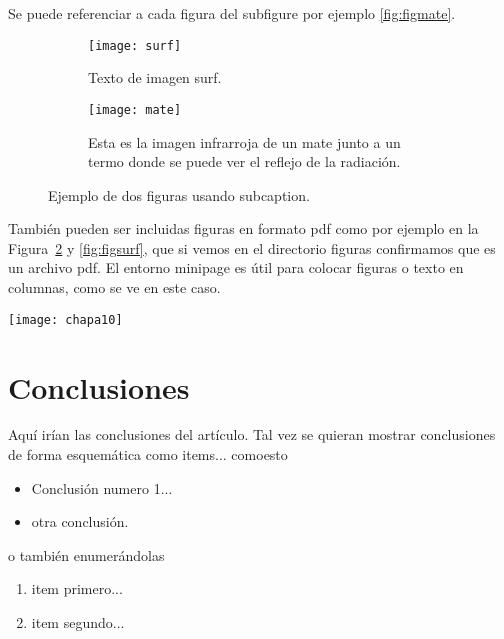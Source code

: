 \documentclass[a4paper,11pt]{article}
\begin{document}
Se puede referenciar a cada figura del subfigure por ejemplo \autoref{fig:figmate}.

\begin{figure}[htb]
  \begin{subfigure}[t]{.6\linewidth}
	\centering
	\texttt{[image: surf]}
	\caption{Texto de imagen surf.}\label{fig:figsurf}
  \end{subfigure}%
  \begin{subfigure}[t]{.4\linewidth}
	\centering
	\texttt{[image: mate]}
	\caption{Esta es la imagen infrarroja de un mate junto a un termo donde se puede ver el reflejo de la radiación.}\label{fig:figmate}
  \end{subfigure}
\caption{Ejemplo de dos figuras usando subcaption.}
\label{fig:mapasej1_CECENR}
\end{figure}


\begin{minipage}[b]{0.45\textwidth}
También pueden ser incluidas figuras en formato pdf como por ejemplo en la Figura~\ref{fig:figmate} y \autoref{fig:figsurf}, que si vemos en el directorio figuras confirmamos que es un archivo pdf. El entorno minipage es útil para colocar figuras o texto en columnas, como se ve en este caso.  
    \end{minipage}
    \hfil
    \begin{minipage}{0.45\textwidth}
        \begin{center}
            \texttt{[image: chapa10]}
        \end{center}
    \end{minipage}


\newpage

\section{Conclusiones}
%
Aquí irían las conclusiones del artículo.  Tal vez se quieran mostrar conclusiones de forma esquemática como items... comoesto
%
\begin{itemize}
  \item Conclusión numero 1... 
  \item otra conclusión.
\end{itemize}

o también enumerándolas

\begin{enumerate}
  \item item primero...
  \item item segundo...
\end{enumerate}
\end{document}
